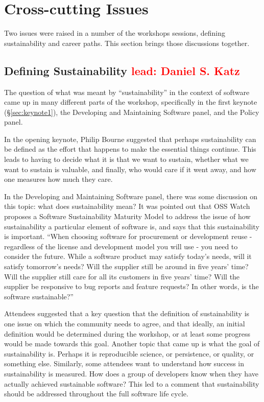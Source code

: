 \documentclass[11pt, oneside]{amsart}
\newcommand{\note}[1]{ {\textcolor{red}    { #1 }}}
\begin{document}
\section{Cross-cutting Issues} \label{sec:cross-cutting}

Two issues were raised in a number of the workshops sessions, defining sustainability and career paths.  This section brings those discussions together.

\subsection{Defining Sustainability \note{lead: Daniel S. Katz}}  \label{sec:defining-sustainability}

The question of what was meant by ``sustainability'' in the context of software
came up in many different parts of the workshop, specifically in the first
keynote (\S\ref{sec:keynote1}), the Developing and Maintaining Software panel,
and the Policy panel.

In the opening keynote, Philip Bourne suggested that perhaps sustainability can
be defined as the effort that happens to make the essential things continue.
This leads to having to decide what it is that we want to sustain, whether what
we want to sustain is valuable, and finally, who would care if it went away,
and how one measures how much they care.

In the Developing and Maintaining Software panel, there was some discussion on
this topic: what does sustainability mean? It was pointed out that OSS Watch
proposes a Software Sustainability Maturity Model to address the issue of how
sustainability a particular element of software is, and says that this
sustainability is important. ``When choosing software for procurement or
development reuse - regardless of the license and development model you will
use - you need to consider the future. While a software product may satisfy
today's needs, will it satisfy tomorrow's needs? Will the supplier still be
around in five years' time? Will the supplier still care for all its customers
in five years' time? Will the supplier be responsive to bug reports and feature
requests? In other words, is the software sustainable?''~\cite{OSS-ssmm-web}

Attendees suggested that a key question that the definition of sustainability
is one issue on which the community needs to agree, and that ideally, an
initial definition would be determined during the workshop, or at least some
progress would be made towards this goal.  Another topic that came up is what
the goal of sustainability is.  Perhaps it is reproducible science, or
persistence, or quality, or something else.  Similarly, some attendees want to
understand how success in sustainability is measured.  How does a group of
developers know when they have actually achieved sustainable software? This led
to a comment that sustainability should be addressed throughout the full
software life cycle.
\end{document}
